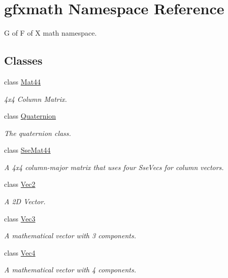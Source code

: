 \hypertarget{namespacegfxmath}{}\section{gfxmath Namespace Reference}
\label{namespacegfxmath}


G of F of X math namespace.  


\subsection*{Classes}
\begin{DoxyCompactItemize}
\item 
class \hyperlink{classgfxmath_1_1_mat44}{Mat44}
\begin{DoxyCompactList}\small\item\em 4x4 Column Matrix. \end{DoxyCompactList}\item 
class \hyperlink{classgfxmath_1_1_quaternion}{Quaternion}
\begin{DoxyCompactList}\small\item\em The quaternion class. \end{DoxyCompactList}\item 
class \hyperlink{classgfxmath_1_1_sse_mat44}{Sse\+Mat44}
\begin{DoxyCompactList}\small\item\em A 4x4 column-\/major matrix that uses four Sse\+Vecs for column vectors. \end{DoxyCompactList}\item 
class \hyperlink{classgfxmath_1_1_vec2}{Vec2}
\begin{DoxyCompactList}\small\item\em A 2\+D Vector. \end{DoxyCompactList}\item 
class \hyperlink{classgfxmath_1_1_vec3}{Vec3}
\begin{DoxyCompactList}\small\item\em A mathematical vector with 3 components. \end{DoxyCompactList}\item 
class \hyperlink{classgfxmath_1_1_vec4}{Vec4}
\begin{DoxyCompactList}\small\item\em A mathematical vector with 4 components. \end{DoxyCompactList}\end{DoxyCompactItemize}
